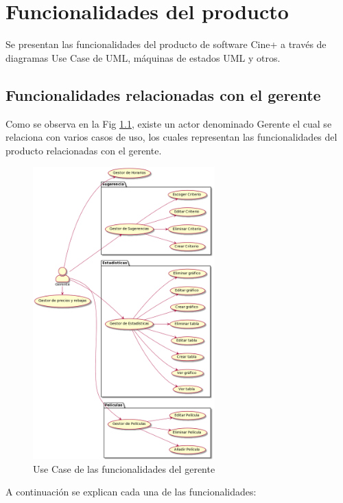 \chapter{Funcionalidades del producto}

Se presentan las funcionalidades del producto de software Cine+ a través de diagramas Use Case de UML, máquinas de estados UML y otros.

\section{Funcionalidades relacionadas con el gerente}

Como se observa en la Fig \ref{fig:gerente}, existe un actor denominado Gerente el cual se relaciona con varios casos de uso, los cuales representan las funcionalidades del producto relacionadas con el gerente.

\begin{figure}[h!]
    \centering
    \includegraphics[width=7cm]{./chapters/img/gerente.png}

    \label{fig:gerente}
    \caption{Use Case de las funcionalidades del gerente}
\end{figure}

A continuación se explican cada una de las funcionalidades:

